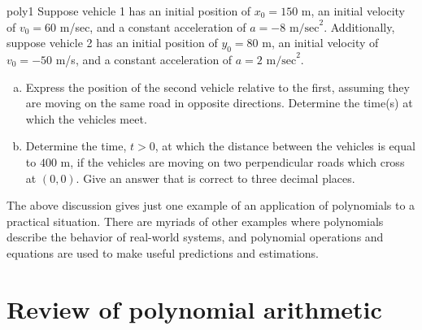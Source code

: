                                    
\begin{exercise}{poly1}
Suppose vehicle 1 has an initial position of $x_0=150$ m, an initial velocity of $v_0=60$  m/sec, and a constant acceleration of $a=-8$ $\text{m/sec}^2$. Additionally, suppose vehicle 2 has an initial position of $y_0=80$ $\text{m}$, an initial velocity of $ v_0=-50$  m/s, and a constant acceleration of $a=2$ $\text{m/sec}^2$.
\begin{enumerate}[(a)]
\item
Express the position of the second vehicle relative to the first, assuming they are moving on the same road in opposite directions. Determine the time(s) at which the vehicles meet.
\item
Determine the time, $t>0$, at which the distance between the vehicles is equal to $400$ $\text{m}$, if the vehicles are moving on two perpendicular roads which cross at $(0, 0)$. Give an answer that is correct to three decimal places.
\end{enumerate}
\end{exercise}

The above discussion gives just one example of an application of polynomials to a practical situation. There are myriads of other examples where polynomials describe the behavior of real-world systems, and polynomial operations and equations are used to make useful predictions and estimations. 

\section{Review of polynomial arithmetic\quad
{}}
\label{sec:polyStripe}


